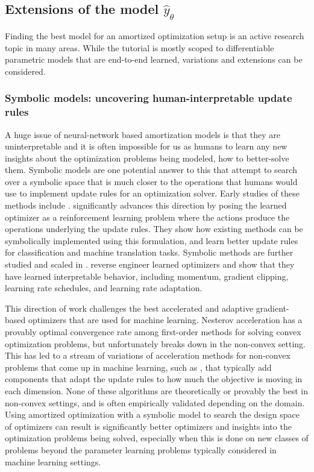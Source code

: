\subsection{Extensions of the model $\hat y_\theta$}
Finding the best model for an amortized optimization setup
is an active research topic in many areas.
While the tutorial is mostly scoped to differentiable
parametric models that are end-to-end learned,
variations and extensions can be considered.

\subsubsection{Symbolic models: uncovering human-interpretable update rules}
A huge issue of neural-network based amortization models
is that they are uninterpretable and it is often impossible
for us as humans to learn any new insights about the optimization
problems being modeled, \eg how to better-solve them.
Symbolic models are one potential answer to this that attempt
to search over a symbolic space that is much closer to the
operations that humans would use to implement update rules for
an optimization solver.
Early studies of these methods include
\citet{bengio1994use,runarsson2000evolution}.
\citet{bello2017neural} significantly advances this direction
by posing the learned optimizer as a reinforcement learning problem
where the actions produce the operations underlying the update rules.
They show how existing methods can be symbolically implemented
using this formulation, and learn better update rules for
classification and machine translation tasks.
Symbolic methods are further studied and scaled in
\citet{real2020automl,zheng2022symbolic}.
\citet{maheswaranathan2021reverse} reverse engineer learned
optimizers and show that they have learned interpretable behavior,
including momentum, gradient clipping, learning rate schedules,
and learning rate adaptation.

This direction of work challenges the best accelerated and adaptive
gradient-based optimizers that are used for machine learning.
Nesterov acceleration \citep{nesterov1983method} has a provably
optimal convergence rate among first-order methods for solving
convex optimization problems, but unfortunately breaks down
in the non-convex setting.
This has led to a stream of variations of acceleration methods
for non-convex problems that come up in machine learning,
such as \citet{duchi2011adaptive,zeiler2012adadelta,kingma2014adam},
that typically add components that adapt the update rules to
how much the objective is moving in each dimension.
None of these algorithms are theoretically or provably the
best in non-convex settings, and is often empirically validated
depending on the domain.
Using amortized optimization with a symbolic model to search
the design space of optimizers can result is significantly
better optimizers and insights into the optimization problems
being solved, especially when this is done on new classes
of problems beyond the parameter learning problems typically
considered in machine learning settings.

